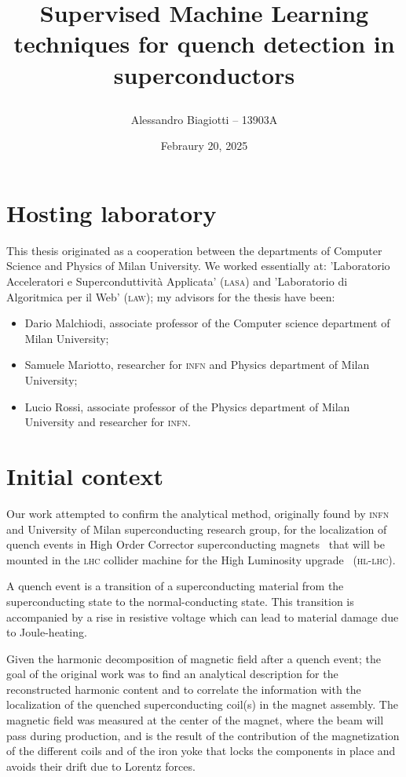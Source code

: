 \documentclass[a4paper, notitlepage]{article}
\title{
	\textsf{Supervised Machine Learning techniques for quench detection in superconductors} \\
	\author{Alessandro Biagiotti -- 13903A}
        \date{Febraury 20, 2025}
}
\begin{document}
\maketitle
\section{Hosting laboratory}
This thesis originated as a cooperation between the departments of Computer Science and Physics of
Milan University. We worked essentially at: 'Laboratorio Acceleratori e Superconduttività Applicata'
(\textsc{lasa}) and 'Laboratorio di Algoritmica per il Web' (\textsc{law}); my advisors for the
thesis have been:
\begin{itemize}
	\item Dario Malchiodi, associate professor of the Computer science department of Milan University;
	\item Samuele Mariotto, researcher for \textsc{infn} and Physics department of Milan
	      University;
	\item Lucio Rossi, associate professor of the Physics department of Milan University and
	      researcher for \textsc{infn}.
\end{itemize}
\section{Initial context}
Our work attempted to confirm the analytical method, originally found by \textsc{infn} and University of Milan superconducting research group, for the localization of quench events in High Order Corrector superconducting magnets~\cite{mariotto2022-hoc, mariotto2022-generic} that will be mounted in the \textsc{lhc} collider machine for the High Luminosity upgrade~\cite{rossi2024-hllhc} (\textsc{hl-lhc}).

A quench event is a transition of a superconducting material from the superconducting state to the
normal-conducting state. This transition is accompanied by a rise in resistive voltage which can
lead to material damage due to Joule-heating.

Given the harmonic decomposition of magnetic field after a quench event; the goal of the original
work was to find an analytical description for the reconstructed harmonic content and to correlate
the information with the localization of the quenched superconducting coil(s) in the magnet
assembly. The magnetic field was measured at the center of the magnet, where the beam will pass
during production, and is the result of the contribution of the magnetization of the different coils
and of the iron yoke that locks the components in place and avoids their drift due to Lorentz
forces.
\end{document}
